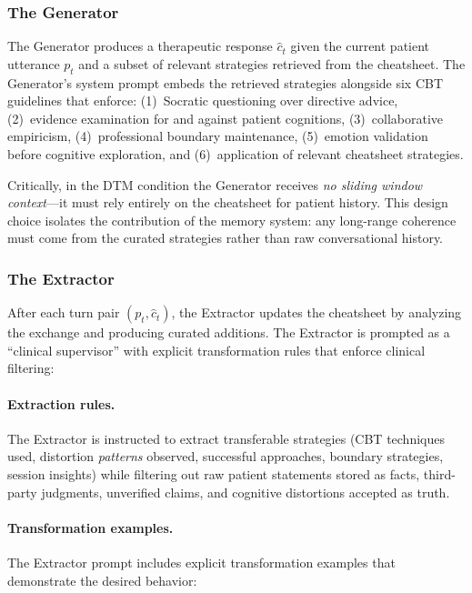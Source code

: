 \subsubsection{The Generator}
\label{sec:generator}

The Generator produces a therapeutic response $\hat{c}_t$ given the current patient utterance $p_t$ and a subset of relevant strategies retrieved from the cheatsheet. The Generator's system prompt embeds the retrieved strategies alongside six CBT guidelines that enforce: (1)~Socratic questioning over directive advice, (2)~evidence examination for and against patient cognitions, (3)~collaborative empiricism, (4)~professional boundary maintenance, (5)~emotion validation before cognitive exploration, and (6)~application of relevant cheatsheet strategies.

Critically, in the DTM condition the Generator receives \emph{no sliding window context}---it must rely entirely on the cheatsheet for patient history. This design choice isolates the contribution of the memory system: any long-range coherence must come from the curated strategies rather than raw conversational history.

\subsubsection{The Extractor}
\label{sec:extractor}

After each turn pair $(p_t, \hat{c}_t)$, the Extractor updates the cheatsheet by analyzing the exchange and producing curated additions. The Extractor is prompted as a ``clinical supervisor'' with explicit transformation rules that enforce clinical filtering:

\paragraph{Extraction rules.} The Extractor is instructed to extract transferable strategies (CBT techniques used, distortion \emph{patterns} observed, successful approaches, boundary strategies, session insights) while filtering out raw patient statements stored as facts, third-party judgments, unverified claims, and cognitive distortions accepted as truth.

\paragraph{Transformation examples.} The Extractor prompt includes explicit transformation examples that demonstrate the desired behavior:

